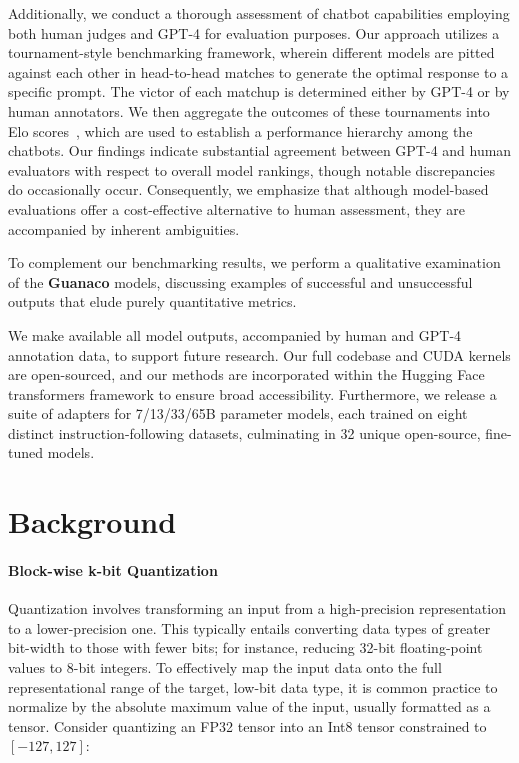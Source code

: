 Additionally, we conduct a thorough assessment of chatbot capabilities employing both human judges and GPT-4 for evaluation purposes. Our approach utilizes a tournament-style benchmarking framework, wherein different models are pitted against each other in head-to-head matches to generate the optimal response to a specific prompt. The victor of each matchup is determined either by GPT-4 or by human annotators. We then aggregate the outcomes of these tournaments into Elo scores~\citep{elo1967proposed, elo1978rating}, which are used to establish a performance hierarchy among the chatbots. Our findings indicate substantial agreement between GPT-4 and human evaluators with respect to overall model rankings, though notable discrepancies do occasionally occur. Consequently, we emphasize that although model-based evaluations offer a cost-effective alternative to human assessment, they are accompanied by inherent ambiguities.

To complement our benchmarking results, we perform a qualitative examination of the \textbf{Guanaco} models, discussing examples of successful and unsuccessful outputs that elude purely quantitative metrics.

We make available all model outputs, accompanied by human and GPT-4 annotation data, to support future research. Our full codebase and CUDA kernels are open-sourced, and our methods are incorporated within the Hugging Face transformers framework \citep{wolf2019huggingface} to ensure broad accessibility. Furthermore, we release a suite of adapters for 7/13/33/65B parameter models, each trained on eight distinct instruction-following datasets, culminating in 32 unique open-source, fine-tuned models.

\section{Background}
\paragraph{Block-wise k-bit Quantization} Quantization involves transforming an input from a high-precision representation to a lower-precision one. This typically entails converting data types of greater bit-width to those with fewer bits; for instance, reducing 32-bit floating-point values to 8-bit integers. To effectively map the input data onto the full representational range of the target, low-bit data type, it is common practice to normalize by the absolute maximum value of the input, usually formatted as a tensor. Consider quantizing an FP32 tensor into an Int8 tensor constrained to $[-127, 127]$:

